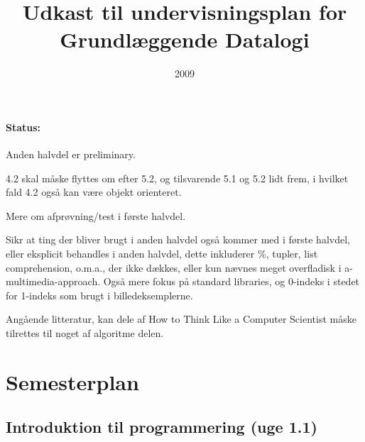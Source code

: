 \documentclass[12pt]{article}
\title{Udkast til undervisningsplan for \\Grundlæggende Datalogi}
\date{2009}
\begin{document}
\maketitle

\paragraph{Status:} 
Anden halvdel er preliminary.

4.2 skal måske flyttes om efter 5.2, og tilsvarende 5.1 og 5.2 lidt frem, i hvilket fald 4.2 også kan være objekt orienteret.

Mere om afprøvning/test i første halvdel.

Sikr at ting der bliver brugt i anden halvdel også kommer med i første halvdel, eller eksplicit behandles i anden halvdel, dette inkluderer \%, tupler, list comprehension, o.m.a., der ikke dækkes, eller kun nævnes meget overfladisk i a-multimedia-approach.
Også mere fokus på standard libraries, og 0-indeks i stedet for 1-indeks som brugt i billedeksemplerne.

Angående litteratur, kan dele af How to Think Like a Computer Scientist måske tilrettes til noget af algoritme delen.


\setcounter{tocdepth}{2}
\tableofcontents

\section{Semesterplan}
\subsection{Introduktion til programmering (uge 1.1)}
\end{document}
